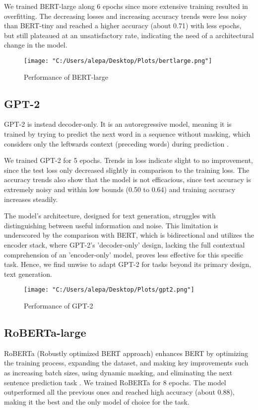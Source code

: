\documentclass[11pt,twocolumn,letterpaper]{article}
\begin{document}
We trained BERT-large along 6 epochs since more extensive training resulted in overfitting. The decreasing losses and increasing accuracy trends were less noisy than BERT-tiny and reached a higher accuracy (about 0.71) with less epochs, but still plateaued at an unsatisfactory rate, indicating the need of a architectural change in the model.

\begin{figure}[h]
	\centering
	\texttt{[image: "C:/Users/alepa/Desktop/Plots/bertlarge.png"]}
	\caption{Performance of BERT-large}
	\label{fig:bert-large}
\end{figure}


\subsection{GPT-2}
GPT-2 is instead decoder-only. It is an autoregressive model, meaning it is trained by trying to predict the next word in a sequence without masking, which considers only the leftwards context (preceding words) during prediction \cite{radford2019language}.

We trained GPT-2 for 5 epochs. Trends in loss indicate slight to no improvement, since the test loss only decreased slightly in comparison to the training loss. The accuracy trends also show that the model is not efficacious, since test accuracy is extremely noisy and within low bounds (0.50 to 0.64) and training accuracy increases steadily.

The model’s architecture, designed for text generation, struggles with distinguishing between useful information and noise. This limitation is underscored by the comparison with BERT, which is bidirectional and utilizes the encoder stack, where GPT-2's 'decoder-only' design, lacking the full contextual comprehension of an 'encoder-only' model, proves less effective for this specific task. Hence, we find unwise to adapt GPT-2 for tasks beyond its primary design, text generation.

\begin{figure}[h]
	\centering
	\texttt{[image: "C:/Users/alepa/Desktop/Plots/gpt2.png"]}
	\caption{Performance of GPT-2}
	\label{fig:gpt-2}
\end{figure}


\subsection{RoBERTa-large}
RoBERTa (Robustly optimized BERT approach) enhances BERT by optimizing the training process, expanding the dataset, and making key improvements such as increasing batch sizes, using dynamic masking, and eliminating the next sentence prediction task \cite{brown2020language}.
We trained RoBERTa for 8 epochs. The model outperformed all the previous ones and reached high accuracy (about 0.88), making it the best and the only model of choice for the task.
\end{document}
